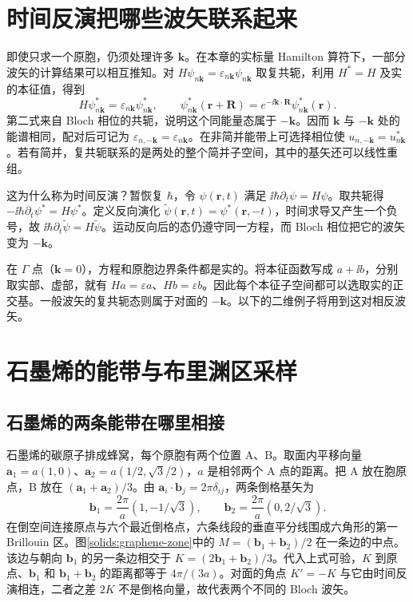 \section{时间反演把哪些波矢联系起来}
即使只求一个原胞，仍须处理许多 $\bm k$。在本章的实标量 Hamilton 算符下，一部分波矢的计算结果可以相互推知。对 $H\psi_{n\bm k}=\varepsilon_{n\bm k}\psi_{n\bm k}$ 取复共轭，利用 $H^*=H$ 及实的本征值，得到
\begin{equation}
H\psi_{n\bm k}^*=\varepsilon_{n\bm k}\psi_{n\bm k}^*,
\qquad
\psi_{n\bm k}^*(\bm r+\bm R)
=e^{-\ii\bm k\cdot\bm R}\psi_{n\bm k}^*(\bm r).
\end{equation}
第二式来自 Bloch 相位的共轭，说明这个同能量态属于 $-\bm k$。因而 $\bm k$ 与 $-\bm k$ 处的能谱相同，配对后可记为 $\varepsilon_{n,-\bm k}=\varepsilon_{n\bm k}$。在非简并能带上可选择相位使 $u_{n,-\bm k}=u_{n\bm k}^*$。若有简并，复共轭联系的是两处的整个简并子空间，其中的基矢还可以线性重组。

这为什么称为时间反演？暂恢复 $\hbar$，令 $\psi(\bm r,t)$ 满足 $\ii\hbar\partial_t\psi=H\psi$。取共轭得 $-\ii\hbar\partial_t\psi^*=H\psi^*$。定义反向演化 $\widetilde\psi(\bm r,t)=\psi^*(\bm r,-t)$，时间求导又产生一个负号，故 $\ii\hbar\partial_t\widetilde\psi=H\widetilde\psi$。运动反向后的态仍遵守同一方程，而 Bloch 相位把它的波矢变为 $-\bm k$。

在 $\Gamma$ 点（$\bm k=0$），方程和原胞边界条件都是实的。将本征函数写成 $a+\ii b$，分别取实部、虚部，就有 $Ha=\varepsilon a$、$Hb=\varepsilon b$。因此每个本征子空间都可以选取实的正交基。一般波矢的复共轭态则属于对面的 $-\bm k$。以下的二维例子将用到这对相反波矢。

\section{石墨烯的能带与布里渊区采样}
\subsection{石墨烯的两条能带在哪里相接}\label{solids:graphene}
石墨烯的碳原子排成蜂窝，每个原胞有两个位置 A、B。取面内平移向量 $\bm a_1=a(1,0)$、$\bm a_2=a(1/2,\sqrt3/2)$，$a$ 是相邻两个 A 点的距离。把 A 放在胞原点，B 放在 $(\bm a_1+\bm a_2)/3$。由 $\bm a_i\cdot\bm b_j=2\pi\delta_{ij}$，两条倒格基矢为
\[
 \bm b_1=\frac{2\pi}{a}(1,-1/\sqrt3),\qquad
 \bm b_2=\frac{2\pi}{a}(0,2/\sqrt3).
\]
在倒空间连接原点与六个最近倒格点，六条线段的垂直平分线围成六角形的第一 Brillouin 区。图\ref{solids:graphene-zone}中的 $M=(\bm b_1+\bm b_2)/2$ 在一条边的中点。该边与朝向 $\bm b_1$ 的另一条边相交于 $K=(2\bm b_1+\bm b_2)/3$。代入上式可验，$K$ 到原点、$\bm b_1$ 和 $\bm b_1+\bm b_2$ 的距离都等于 $4\pi/(3a)$。对面的角点 $K'=-K$ 与它由时间反演相连，二者之差 $2K$ 不是倒格向量，故代表两个不同的 Bloch 波矢。

